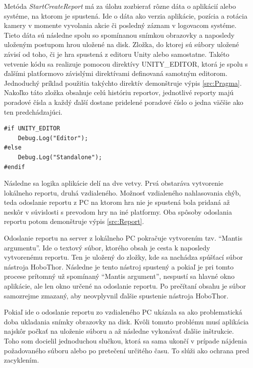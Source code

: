 \documentclass[slovak, bachelorpractice]{diploma}
\begin{document}
Metóda \textit{StartCreateReport} má za úlohu zozbierať rôzne dáta o aplikácií alebo systéme, na ktorom je spustená. Ide o dáta ako verzia aplikácie, pozícia a rotácia kamery v momente vyvolania akcie či posledný záznam v logovacom systéme. Tieto dáta sú následne spolu so spomínanou snímkou obrazovky a naposledy uloženým postupom hrou uložené na disk. Zložka, do ktorej sú súbory uložené závisí od toho, či je hra spustená z editoru Unity alebo samostatne. Takéto vetvenie kódu sa realizuje pomocou direktívy UNITY\_EDITOR, ktorá je spolu s ďalšími platformovo závislými direktívami definovaná samotným editorom. Jednoduchý príklad použitia takýchto direktív demonštruje výpis \ref{src:Pragma}. Nakoľko táto zložka obsahuje celú históriu reportov, jednotlivé reporty majú poradové čísla a každý ďalší dostane pridelené poradové číslo o jedna väčšie ako ten predchádzajúci.
\vspace{10pt}
\begin{lstlisting}[label=src:Pragma,caption={Ukážka použitia direktívy UNITY\_EDITOR}]
#if UNITY_EDITOR
	Debug.Log("Editor");                
#else
    Debug.Log("Standalone");             
#endif
\end{lstlisting}

Následne sa logika aplikácie delí na dve vetvy. Prvá obstaráva vytvorenie lokálneho reportu, druhá vzdialeného. Možnosť vzdialeného nahlasovania chýb, teda odoslanie reportu z PC na ktorom hra nie je spustená bola pridaná až neskôr v súvislosti s prevodom hry na iné platformy. Oba spôsoby odoslania reportu potom demonštruje výpis \ref{src:Report}.

Odoslanie reportu na server z lokálneho PC pokračuje vytvorením tzv. \enquote{Mantis argumentu}. Ide o textový súbor, ktorého obsah je cesta k naposledy vytvorenému reportu. Ten je uložený do zložky, kde sa nachádza spúšťací súbor nástroja HoboThor. Následne je tento nástroj spustený a pokiaľ je pri tomto procese prítomný už spomínaný \enquote{Mantis argument}, nespustí sa hlavné okno aplikácie, ale len okno určené na odoslanie reportu. Po prečítaní obsahu je súbor samozrejme zmazaný, aby neovplyvnil ďalšie spustenie nástroja HoboThor.

Pokiaľ ide o odoslanie reportu zo vzdialeného PC ukázala sa ako problematická doba ukladania snímky obrazovky na disk. Kvôli tomuto problému musí aplikácia najskôr počkať na uloženie súboru a až následne vykonávať ďalšie inštrukcie. Toho som docielil jednoduchou slučkou, ktorá sa sama ukončí v prípade nájdenia požadovaného súboru alebo po pretečení určitého času. To slúži ako ochrana pred zacyklením. 
\end{document}
